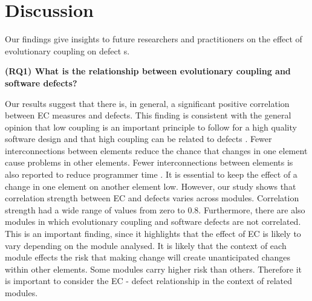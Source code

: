 \documentclass[times]{smrauth}
\begin{document}
\section{Discussion}

Our findings give insights to future researchers and practitioners on
the effect of evolutionary coupling on  defect s.


\textbf{(RQ1) What is the relationship between evolutionary coupling and software defects?} 

Our results suggest that there is, in general, a significant positive correlation between EC measures and defects. This finding is consistent with the general opinion that low coupling is an important principle to follow for a high quality software design and that high coupling can be related to defects \cite{briand1999unified} \cite{briand2000exploring} \cite{baldwin2000design}. Fewer interconnections between elements reduce the chance that changes in one element cause problems in other elements. Fewer interconnections between elements is also reported to reduce programmer time \cite{harrold2003software}. It is essential to keep the effect of a change in one element on another element low. However, our study shows that correlation strength between EC and defects varies across modules. Correlation strength had a wide range of values from zero to 0.8. Furthermore, there are also modules in which evolutionary coupling and software defects are not correlated. This is an important finding, since it highlights that the effect of EC is likely to vary depending on the module analysed. It is likely that the context of each module effects the risk that making change will create unanticipated changes within other elements. Some modules carry higher risk than others. Therefore it is important to consider the EC - defect relationship in the context of related modules.
\end{document}
